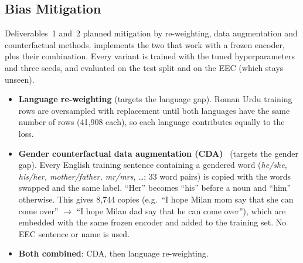 \documentclass[11pt,a4paper]{article}
\begin{document}
\subsection{Bias Mitigation}
\label{sec:mitigation}
Deliverables~1 and~2 planned mitigation by re-weighting, data augmentation and counterfactual
methods.  implements the two that work with a frozen encoder, plus
their combination. Every variant is trained with the tuned hyperparameters and three seeds,
and evaluated on the test split and on the EEC (which stays unseen).
\begin{itemize}
  \item \textbf{Language re-weighting} (targets the language gap). Roman Urdu training rows are
        oversampled with replacement until both languages have the same number of rows
        (41,908 each), so each language contributes equally to the loss.
  \item \textbf{Gender counterfactual data augmentation (CDA)}~\cite{lu2020,zhao2018} (targets
        the gender gap). Every English training sentence containing a gendered word
        (\emph{he/she, his/her, mother/father, mr/mrs}, \ldots; 33 word pairs) is copied with
        the words swapped and the same label. ``Her'' becomes ``his'' before a noun and ``him''
        otherwise. This gives 8,744 copies (e.g.\ ``I hope Milan mom say that she can come
        over'' $\to$ ``I hope Milan dad say that he can come over''), which are embedded with
        the same frozen encoder and added to the training set. No EEC sentence or name is used.
  \item \textbf{Both combined}: CDA, then language re-weighting.
\end{itemize}
\end{document}
